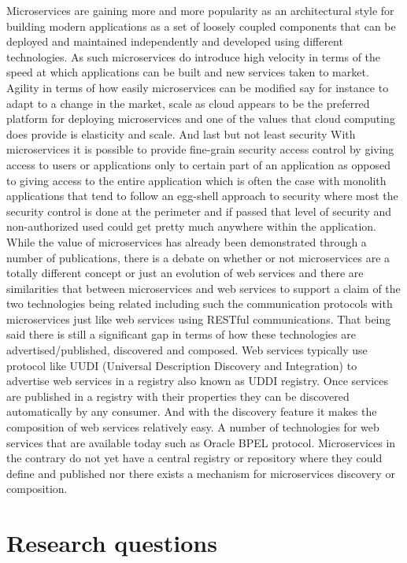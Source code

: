 \documentclass{article}
\begin{document}
Microservices are gaining more and more popularity as an architectural style for building modern applications as a set of loosely coupled components that can be deployed and maintained independently and developed using different technologies. 
As such microservices do introduce high velocity in terms of the speed at which applications can be built and new services taken to market. Agility in terms of how easily microservices can be modified say for instance to adapt to a change in the market, scale as cloud appears to be the preferred platform for deploying microservices and one of the values that cloud computing does provide is elasticity and scale. And last but not least security With microservices it is possible to provide fine-grain security access control by giving access to users or applications only to certain part of an application as opposed to giving access to the entire application which is often the case with monolith applications that tend to follow an egg-shell approach to security where most the security control is done at the perimeter and if passed that level of security and non-authorized used could get pretty much anywhere within the application. While the value of microservices has already been demonstrated through a number of publications, there is a debate on whether or not microservices are a totally different concept or just an evolution of web services and there are similarities that between microservices and web services to support a claim of the two technologies being related including such the communication protocols with microservices just like web services using RESTful communications. That being said there is still a significant gap in terms of how these technologies are advertised/published, discovered and composed. Web services typically use protocol like UUDI (Universal Description Discovery and Integration) to advertise web services in a registry also known as UDDI registry. Once services are published in a registry with their properties they can be discovered automatically by any consumer. And with the discovery feature it makes the composition of web services relatively easy. A number of technologies for web services that are available today such as Oracle BPEL protocol. Microservices in the contrary do not yet have a central registry or repository where they could define and published nor there exists a mechanism for microservices discovery or composition. 

\section{Research questions}
\end{document}
